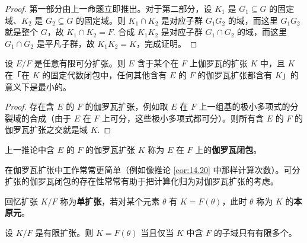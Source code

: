 \begin{proof}
第一部分由上一命题立即推出。对于第二部分，设 \(K_1\) 是 \(G_1 \subseteq G\) 的固定域、\(K_2\) 是 \(G_2 \subseteq G\) 的固定域。则 \(K_1 \cap K_2\) 是对应子群 \(G_1G_2\) 的域，而这里 \(G_1G_2\) 就是整个 \(G\)，故 \(K_1 \cap K_2 = F\). 合成 \(K_1K_2\) 是对应子群 \(G_1 \cap G_2\) 的域，而这里 \(G_1 \cap G_2\) 是平凡子群，故 \(K_1K_2 = K\)，完成证明。
\end{proof}

\begin{corollary}\label{cor:14.23}
设 \(E/F\) 是任意有限可分扩张。则 \(E\) 含于某个在 \(F\) 上伽罗瓦的扩张 \(K\) 中，且 \(K\) 在「在 \(K\) 的固定代数闭包中，任何其他含有 \(E\) 的 \(F\) 的伽罗瓦扩张都含有 \(K\)」的意义下是最小的。
\end{corollary}

\begin{proof}
存在含 \(E\) 的 \(F\) 的伽罗瓦扩张，例如取 \(E\) 在 \(F\) 上一组基的极小多项式的分裂域的合成（由于 \(E\) 在 \(F\) 上可分，这些极小多项式都可分）。则所有含 \(E\) 的 \(F\) 的伽罗瓦扩张之交就是域 \(K\).
\end{proof}

\begin{definition}
上一推论中含 \(E\) 的 \(F\) 的伽罗瓦扩张 \(K\) 称为 \(E\) 在 \(F\) 上的\textbf{伽罗瓦闭包}。
\end{definition}

在伽罗瓦扩张中工作常常更简单（例如像推论 \ref{cor:14.20} 中那样计算次数）。可分扩张的伽罗瓦闭包的存在性常常有助于把计算化归为对伽罗瓦扩张的考虑。

回忆扩张 \(K/F\) 称为\textbf{单扩张}，若对某个元素 \(\theta\) 有 \(K = F(\theta)\)，此时 \(\theta\) 称为 \(K\) 的\textbf{本原元}。

\begin{proposition}\label{pro:14.24}
设 \(K/F\) 是有限扩张。则 \(K = F(\theta)\) 当且仅当 \(K\) 中含 \(F\) 的子域只有有限多个。
\end{proposition}


